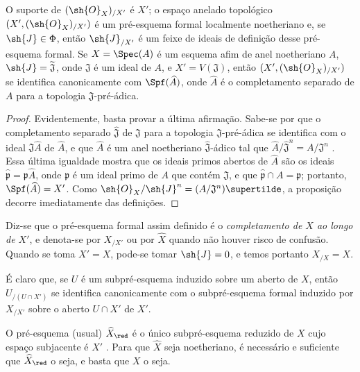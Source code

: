 \documentclass[oneside]{amsart}
\let\EGAOriginalLabel\label
\renewcommand{\label}[1]{\phantomsection\EGAOriginalLabel{#1}}
\begin{document}
\begin{proposition}[10.8.5]
\label{I.10.8.5}
O suporte de $(\sh{O}_X)_{/X'}$ é $X'$; o espaço anelado topológico $(X',(\sh{O}_X)_{/X'})$ é um pré-esquema formal localmente noetheriano e, se $\sh{J}\in\Phi$, então $\sh{J}_{/X'}$ é um feixe de ideais de definição desse pré-esquema formal.
Se $X=\Spec(A)$ é um esquema afim de anel noetheriano $A$, $\sh{J}=\widetilde{\mathfrak{J}}$, onde $\mathfrak{J}$ é um ideal de $A$, e $X'=V(\mathfrak{J})$, então $(X',(\sh{O}_X)_{/X'})$ se identifica canonicamente com $\Spf(\widehat{A})$, onde $\widehat{A}$ é o completamento separado de $A$ para a topologia $\mathfrak{J}$-pré-ádica.
\end{proposition}

\begin{proof}
Evidentemente, basta provar a última afirmação.
Sabe-se por  que o completamento separado $\widehat{\mathfrak{J}}$ de $\mathfrak{J}$ para a topologia $\mathfrak{J}$-pré-ádica se identifica com o ideal $\mathfrak{J}\widehat{A}$ de $\widehat{A}$, e que $\widehat{A}$ é um anel noetheriano $\widehat{\mathfrak{J}}$-ádico tal que $\widehat{A}/\widehat{\mathfrak{J}}^n=A/\mathfrak{J}^n$ .
Essa última igualdade mostra que os ideais primos abertos de $\widehat{A}$ são os ideais $\widehat{\mathfrak{p}}=\mathfrak{p}\widehat{A}$, onde $\mathfrak{p}$ é um ideal primo de $A$ que contém $\mathfrak{J}$, e que $\widehat{\mathfrak{p}}\cap A=\mathfrak{p}$; portanto, $\Spf(\widehat{A})=X'$.
Como $\sh{O}_X/\sh{J}^n=(A/\mathfrak{J}^n)\supertilde$, a proposição decorre imediatamente das definições.
\end{proof}

Diz-se que o pré-esquema formal assim definido é o \emph{completamento de $X$ ao longo de $X'$}, e denota-se por $X_{/X'}$ ou por $\widehat{X}$ quando não houver risco de confusão.
Quando se toma $X'=X$, pode-se tomar $\sh{J}=0$, e temos portanto $X_{/X}=X$.

É claro que, se $U$ é um subpré-esquema induzido sobre um aberto de $X$, então $U_{/(U\cap X')}$ se identifica canonicamente com o subpré-esquema formal induzido por $X_{/X'}$ sobre o aberto $U\cap X'$ de $X'$.

\begin{corollary}[10.8.6]
\label{I.10.8.6}
O pré-esquema (usual) $\widehat{X}_\red$ é o único subpré-esquema reduzido de $X$ cujo espaço subjacente é $X'$ .
Para que $\widehat{X}$ seja noetheriano, é necessário e suficiente que $\widehat{X}_\red$ o seja, e basta que $X$ o seja.
\end{corollary}
\end{document}
